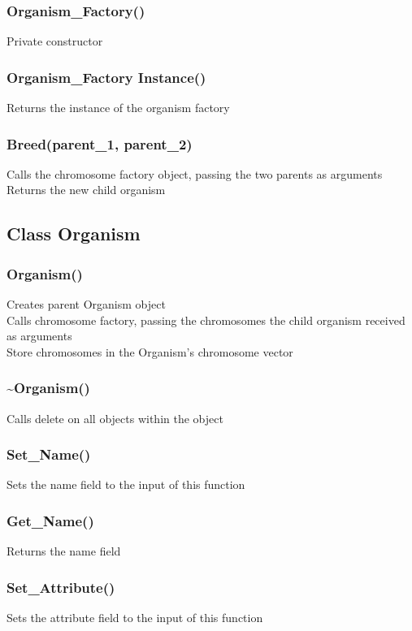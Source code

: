 \documentclass{article}
\begin{document}
\subsubsection{Organism\_Factory()}
\indent Private constructor

\subsubsection{Organism\_Factory Instance()}
\indent Returns the instance of the organism factory

\subsubsection{Breed(parent\_1, parent\_2)}
\indent Calls the chromosome factory object, passing the two parents as arguments
\indent Returns the new child organism

\newpage

\subsection{Class Organism}
\subsubsection{Organism()}
\indent Creates parent Organism object \\
\indent Calls chromosome factory, passing the chromosomes the child organism received as arguments \\
\indent Store chromosomes in the Organism's chromosome vector \\

\subsubsection{\textasciitilde Organism()}
\indent Calls delete on all objects within the object

\subsubsection{Set\_Name()}
\indent Sets the name field to the input of this function

\subsubsection{Get\_Name()}
\indent Returns the name field

\subsubsection{Set\_Attribute()}
\indent Sets the attribute field to the input of this function
\end{document}
